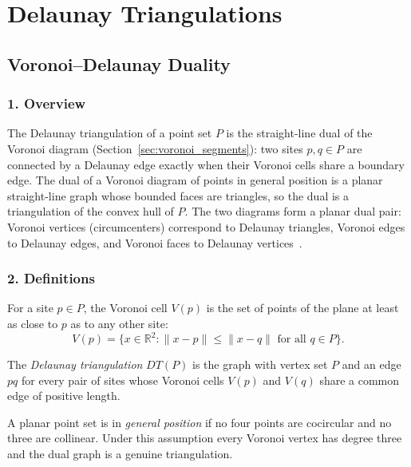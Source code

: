 \chapter{Delaunay Triangulations}
\label{ch:delaunay_triangulations}

\section{Voronoi--Delaunay Duality}
\label{sec:delaunay_duality}

\subsection{1. Overview}

The Delaunay triangulation of a point set $P$ is the
straight-line dual of the Voronoi diagram (Section~\ref{sec:voronoi_segments}):
two sites $p,q \in P$ are connected by a Delaunay edge exactly when their
Voronoi cells share a boundary edge. The dual of a Voronoi diagram of points in
general position is a planar straight-line graph whose bounded faces are
triangles, so the dual is a triangulation of the convex hull of $P$. The two
diagrams form a planar dual pair: Voronoi vertices (circumcenters) correspond to
Delaunay triangles, Voronoi edges to Delaunay edges, and Voronoi faces to
Delaunay vertices~\cite{deberg2008,okabe2000}.

\subsection{2. Definitions}

\begin{definition}\label{def:voronoi_cell_delaunay}
For a site $p \in P$, the Voronoi cell $V(p)$ is the set of points of the plane
at least as close to $p$ as to any other site:
\[
V(p) = \{ x \in \mathbb{R}^2 : \|x - p\| \le \|x - q\| \text{ for all } q \in P \}.
\]
\end{definition}

\begin{definition}\label{def:delaunay_dual}
The \emph{Delaunay triangulation} $DT(P)$ is the graph with vertex set $P$ and an
edge $pq$ for every pair of sites whose Voronoi cells $V(p)$ and $V(q)$ share a
common edge of positive length.
\end{definition}

\begin{definition}\label{def:general_position_delaunay}
A planar point set is in \emph{general position} if no four points are
cocircular and no three are collinear. Under this assumption every Voronoi
vertex has degree three and the dual graph is a genuine triangulation.
\end{definition}

